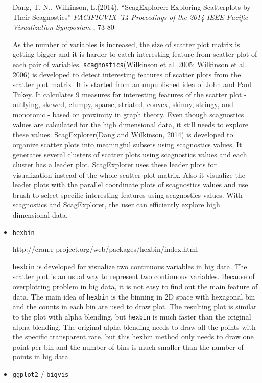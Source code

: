 \documentclass{article}
\begin{document}
\begin{itemize}
Dang, T. N., Wilkinson, L.(2014).
``ScagExplorer: Exploring Scatterplots by Their Scagnostics''
{\em PACIFICVIX '14 Proceedings of the 2014 IEEE Pacific Visualization Symposium }, 73-80

As the number of variables is increased, the size of scatter plot matrix is getting bigger and  it is  harder to catch interesting feature from scatter plot of each pair of variables. {\tt scagnostics}(Wilkinson et al. 2005; Wilkinson et al. 2006) is developed to detect interesting features of scatter plots from the scatter plot matrix. It is started from an unpublished idea of John and Paul Tukey. It calculates 9 measures for interesting features of the scatter plot - outlying, skewed, clumpy, sparse, striated, convex, skinny, stringy, and monotonic - based on proximity in graph theory. Even though scagnostics values are calculated for the high dimensional data, it still needs to explore these values.
ScagExplorer(Dang and Wilkinson, 2014) is developed to organize scatter plots into meaningful subsets using scagnostics values. It generates several clusters of scatter plots using scagnostics values and each cluster has a leader plot. ScagExplorer uses these leader plots for visualization instead of the whole scatter plot matrix. Also it visualize the leader plots with the parallel coordinate plots of scagnostics values and use brush to select specific interesting features using scagnostics values. With scagnostics and ScagExplorer, the user can efficiently explore high dimensional data.

\item {\tt hexbin }

http://cran.r-project.org/web/packages/hexbin/index.html

{\tt hexbin} is developed for visualize two continuous variables in big data. The scatter plot is an usual way to represent two continuous variables. Because of overplotting problem in big data, it is not easy to find out the main feature of data. The main idea of {\tt hexbin} is the binning in 2D space with hexagonal bin and the counts in each bin are used to draw plot. The resulting plot is similar to the plot with alpha blending, but {\tt hexbin} is much faster than the original alpha blending. The original alpha blending needs to draw all the points with the specific transparent rate, but this hexbin method only needs to draw one point per bin and the number of bins is much smaller than the number of points in big data.

\item {\tt ggplot2} / {\tt bigvis}


\end{itemize}
\end{document}
